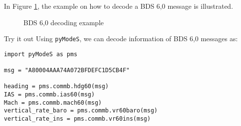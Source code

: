 In Figure \ref{fig:bds60_example}, the example on how to decode a BDS 6,0 message is illustrated.

\begin{figure}[ht]
  \centering
  
  \vspace{0.5cm}
  \caption{BDS 6,0 decoding example}
  \label{fig:bds60_example}
\end{figure}

\begin{notebox}{Try it out}
Using \texttt{pyModeS}, we can decode information of BDS 6,0 messages as: 

\begin{verbatim}
import pyModeS as pms

msg = "A80004AAA74A072BFDEFC1D5CB4F"

heading = pms.commb.hdg60(msg)
IAS = pms.commb.ias60(msg)
Mach = pms.commb.mach60(msg)
vertical_rate_baro = pms.commb.vr60baro(msg)
vertical_rate_ins = pms.commb.vr60ins(msg)
\end{verbatim}

\end{notebox}
